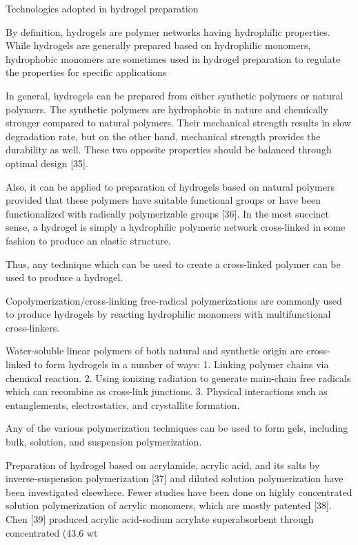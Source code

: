 \documentclass[../../main-notes.tex]{subfiles}
\begin{document}
Technologies adopted in hydrogel preparation

By definition, hydrogels are polymer networks having hydrophilic properties. 
While hydrogels are generally prepared based on hydrophilic monomers, hydrophobic monomers are sometimes used in hydrogel preparation to regulate the properties for specific applications

In general, hydrogels can be prepared from either synthetic polymers or natural polymers. 
The synthetic polymers are hydrophobic in nature and chemically stronger compared to natural polymers. 
Their mechanical strength results in slow degradation rate, but on the other hand, mechanical strength provides the durability as well. 
These two opposite properties should be balanced through optimal design [35]. 

Also, it can be applied to preparation of hydrogels based on natural polymers provided that these polymers have suitable functional groups or have been functionalized with radically polymerizable groups [36]. 
In the most succinct sense, a hydrogel is simply a hydrophilic polymeric network cross-linked in some fashion to produce an elastic structure. 

Thus, any technique which can be used to create a cross-linked polymer can be used to produce a hydrogel. 

Copolymerization/cross-linking free-radical polymerizations are commonly used to produce hydrogels by reacting hydrophilic monomers with multifunctional cross-linkers. 

Water-soluble linear polymers of both natural and synthetic origin are cross-linked to form hydrogels in a number of ways:
1. Linking polymer chains via chemical reaction. 
2. Using ionizing radiation to generate main-chain free radicals which can recombine as cross-link junctions. 
3. Physical interactions such as entanglements, electrostatics, and crystallite formation.

Any of the various polymerization techniques can be used to form gels, including bulk, solution, and suspension polymerization.

Preparation of hydrogel based on acrylamide, acrylic acid, and its salts by inverse-suspension polymerization [37] and diluted solution polymerization have been investigated elsewhere. 
Fewer studies have been done on highly concentrated solution polymerization of acrylic monomers, which are mostly patented [38]. 
Chen [39] produced acrylic acid-sodium acrylate superabsorbent through concentrated (43.6 wt%
\end{document}

